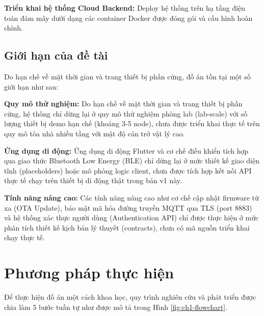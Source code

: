 \textbf{Triển khai hệ thống Cloud Backend:} Deploy hệ thống trên hạ tầng điện toán đám mây dưới dạng các container Docker được đóng gói và cấu hình hoàn chỉnh.

\subsection{Giới hạn của đề tài}
Do hạn chế về mặt thời gian và trang thiết bị phần cứng, đồ án tồn tại một số giới hạn như sau:

\textbf{Quy mô thử nghiệm:} Do hạn chế về mặt thời gian và trang thiết bị phần cứng, hệ thống chỉ dừng lại ở quy mô thử nghiệm phòng lab (lab-scale) với số lượng thiết bị demo hạn chế (khoảng 3-5 node), chưa được triển khai thực tế trên quy mô tòa nhà nhiều tầng với mật độ cản trở vật lý cao.

\textbf{Ứng dụng di động:} Ứng dụng di động Flutter và cơ chế điều khiển tích hợp qua giao thức Bluetooth Low Energy (BLE) chỉ dừng lại ở mức thiết kế giao diện tĩnh (placeholders) hoặc mô phỏng logic client, chưa được tích hợp kết nối API thực tế chạy trên thiết bị di động thật trong bản v1 này.

\textbf{Tính năng nâng cao:} Các tính năng nâng cao như cơ chế cập nhật firmware từ xa (OTA Update), bảo mật mã hóa đường truyền MQTT qua TLS (port 8883) và hệ thống xác thực người dùng (Authentication API) chỉ được thực hiện ở mức phân tích thiết kế kịch bản lý thuyết (contracts), chưa có mã nguồn triển khai chạy thực tế.

\newpage
\section{Phương pháp thực hiện}
\label{sec:ch1-phuongphap}
    
Để thực hiện đồ án một cách khoa học, quy trình nghiên cứu và phát triển được chia làm 5 bước tuần tự như được mô tả trong Hình \ref{fig:ch1-flowchart}.

